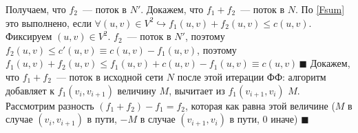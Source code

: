 \documentclass[a4paper]{article}
\begin{document}
Получаем, что $f_2$~--- поток в $N'$. Докажем, что $f_1+f_2$~--- поток в $N$. По \ref{Fsum} это выполнено, если $\forall (u,v)\in V^2\hookrightarrow f_1(u,v)+f_2(u,v)\leqslant c(u,v)$. Фиксируем $(u,v)\in V^2$. $f_2$~--- поток в $N'$, поэтому $f_2(u,v)\leqslant c'(u,v)\equiv c(u,v)-f_1(u,v)$, поэтому $f_1(u,v)+f_2(u,v)\leqslant f_1(u,v)+c(u,v)-f_1(u,v)\equiv c(u,v)\,\blacksquare$\newline
Докажем, что $f_1+f_2$~--- поток в исходной сети $N$ после этой итерации ФФ: алгоритм добавляет к $f_1(v_i,v_{i+1})$ величину $M$, вычитает из $f_1(v_{i+1},v_i)$ $M$. Рассмотрим разность $(f_1+f_2)-f_1=f_2$, которая как равна этой величине ($M$ в случае $(v_i,v_{i+1})$ в пути, $-M$ в случае $(v_{i+1},v_i)$ в пути, $0$ иначе) $\blacksquare$
\end{document}
